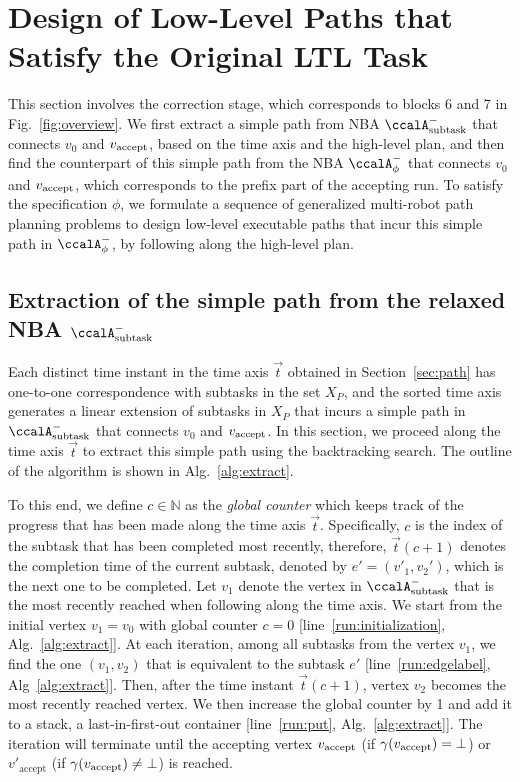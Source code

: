 \documentclass[Afour,sageh,times]{sagej}
\newcommand{\auto}[1]{\ccalA_{\textup{#1}}}
\newcommand{\autop}{\ccalA_{\phi}}
\newcommand{\vertex}[1]{v_{\textup{#1}}}
\begin{document}
{{  \section{Design of Low-Level Paths that Satisfy the Original LTL Task}\label{sec:solution2mrta}
 This section involves the correction stage, which corresponds to blocks 6 and 7 in Fig.~\ref{fig:overview}. We first extract a simple path from NBA $\auto{subtask}^-$ that connects $v_0$ and $\vertex{accept}$, based on the time axis and the high-level plan, and then find the counterpart of this simple path from the NBA $\autop^-$ that connects $v_0$ and $\vertex{accept}$, which corresponds to the prefix part of the accepting run. To satisfy the specification $\phi$, we formulate a sequence of generalized multi-robot path planning problems to design low-level executable paths that incur this simple path in $\autop^-$, by following along the high-level plan.
\subsection{Extraction of the simple path from the relaxed NBA \upshape $\auto{subtask}^-$}\label{sec:run}

Each distinct time instant in the time axis $\vec{t}$ obtained in Section~\ref{sec:path} has one-to-one correspondence with subtasks in the set $X_P$, and the sorted time axis generates a linear extension of subtasks in $X_P$ that incurs a simple path in $\auto{subtask}^-$ that connects $v_{0}$ and $\vertex{accept}$. In this section, we proceed along the time axis $\vec{t}$ to extract this simple path using the backtracking search. The outline of the algorithm is shown in Alg.~\ref{alg:extract}.

  To this end, we define $c\in \mathbb{N}$ as the {\it global counter} which keeps track of the progress that has been made along the time axis $\vec{t}$. Specifically, $c$ is the index of the subtask that  has  been completed most recently, therefore, $\vec{t}(c+1)$ denotes  the  completion time of the current subtask, denoted by $e' = (v'_1, v_2')$, which is  the next one to be completed. Let $v_1$ denote the vertex in $\auto{subtask}^-$ that is the  most recently reached when following along the time axis.  We start from the initial vertex $v_1= v_0$ with global counter $c=0$ [line~\ref{run:initialization}, Alg.~\ref{alg:extract}]. At each iteration, among all subtasks from the vertex $v_1$, we find the one $(v_1, v_2)$ that is  equivalent to the  subtask $e'$ [line~\ref{run:edgelabel}, Alg~\ref{alg:extract}]. Then, after the time instant $\vec{t}(c+1)$,  vertex $v_2$ becomes the most recently reached vertex. We then increase the global counter by 1 and add it to a stack, a last-in-first-out container [line~\ref{run:put}, Alg.~\ref{alg:extract}]. The iteration will terminate until the accepting vertex $\vertex{accept}$ (if $\gamma(\vertex{accept}) = \bot$) or $v'_{\text{accept}}$ (if $\gamma(\vertex{accept})\neq \bot$) is reached.


}}
\end{document}
